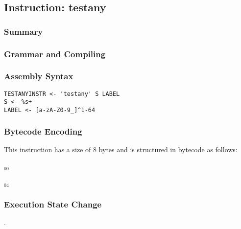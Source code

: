 \subsection{Instruction: testany}

\subsubsection{Summary}


\subsubsection{Grammar and Compiling}


\subsubsection{Assembly Syntax}

\begin{myquote}
\begin{verbatim}
TESTANYINSTR <- 'testany' S LABEL
S <- %s+
LABEL <- [a-zA-Z0-9_]^1-64
\end{verbatim}
\end{myquote}


\subsubsection{Bytecode Encoding}

This instruction has a size of 8 bytes and is structured in bytecode as follows:

$_{00}$\ 



$_{04}$\ 


\subsubsection{Execution State Change}

.


